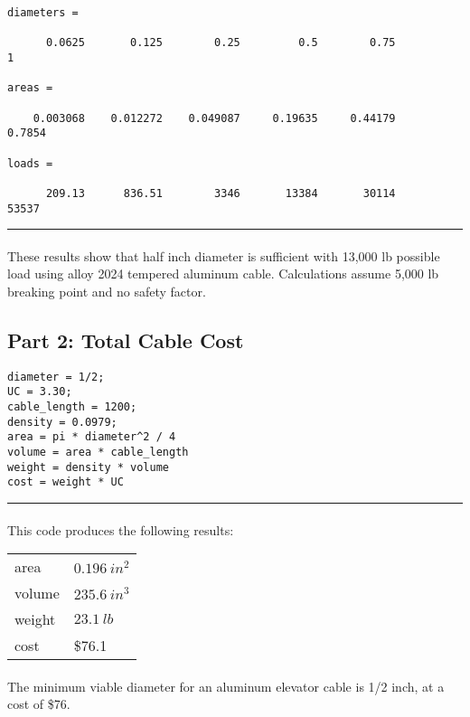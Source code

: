 \documentclass[paper=a4, fontsize=12pt]{scrartcl} %
\newcommand{\HRule}{\rule{\linewidth}{0.5mm}}
\numberwithin{equation}{section} %
\numberwithin{figure}{section} %
\numberwithin{table}{section} %
\begin{document}
\begin{lstlisting}[label=areas-loads-results,caption=Results for Areas and Loads]
diameters =

      0.0625       0.125        0.25         0.5        0.75          1

areas =

    0.003068    0.012272    0.049087     0.19635     0.44179      0.7854

loads =

      209.13      836.51        3346       13384       30114       53537

\end{lstlisting}

\HRule

\paragraph{} These results show that half inch diameter is sufficient with 13,000 lb possible load using alloy 2024 tempered aluminum cable. Calculations assume 5,000 lb breaking point and no safety factor.

\subsection*{Part 2: Total Cable Cost}

\begin{lstlisting}[label=cost,caption=Volume Weight \& Total Cost]
diameter = 1/2;
UC = 3.30;
cable_length = 1200;
density = 0.0979;
area = pi * diameter^2 / 4
volume = area * cable_length
weight = density * volume
cost = weight * UC
\end{lstlisting}

\HRule
\paragraph{} This code produces the following results: \\
\begin{tabularx}{250px}{X X}
area & $0.196\ in^2$ \\
volume & $235.6\ in^3$ \\
weight & $23.1\ lb$ \\
cost & \$76.1 \\
\hline
\end{tabularx}

\paragraph{} The minimum viable diameter for an aluminum elevator cable is 1/2 inch, at a cost of \$76.
\newpage
\end{document}
